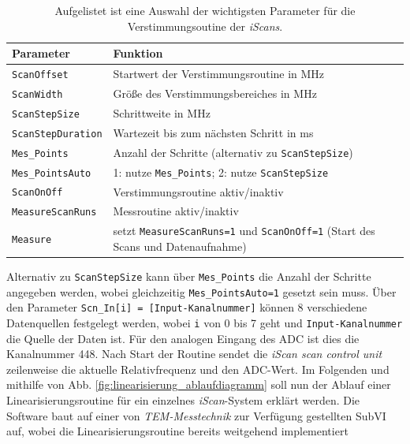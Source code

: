 \begin{table}
	\begin{tabular}{p{}p{}}
		\toprule
			Parameter & Funktion \\
		\midrule[1px]
		\hline
			\lstinline|ScanOffset| & Startwert der Verstimmungsroutine in MHz\\
			\lstinline|ScanWidth| & Größe des Verstimmungsbereiches in MHz\\
			\lstinline|ScanStepSize| & Schrittweite in MHz\\
			\lstinline|ScanStepDuration| & Wartezeit bis zum nächsten Schritt in ms\\
			\lstinline|Mes_Points| & Anzahl der Schritte (alternativ zu
			\lstinline|ScanStepSize|)\\
			\lstinline|Mes_PointsAuto| & 1: nutze \lstinline|Mes_Points|; 2: nutze
			\lstinline|ScanStepSize|\\
			\lstinline|ScanOnOff| & Verstimmungsroutine aktiv/inaktiv\\
			\lstinline|MeasureScanRuns| & Messroutine aktiv/inaktiv\\
			\lstinline|Measure| & setzt
			\lstinline|MeasureScanRuns=1| und \lstinline|ScanOnOff=1| (Start des Scans
			und Datenaufnahme)\\
		\bottomrule[1px]
	\end{tabular}
	\caption[Parameter der Verstimmungsoutine]{Aufgelistet ist eine
	Auswahl der wichtigsten Parameter für die Verstimmungsoutine der
	\textit{iScans}.}
	\label{tab:verstimmungsroutine_parameter}
\end{table}
Alternativ zu \lstinline|ScanStepSize| kann über \lstinline|Mes_Points| die
Anzahl der Schritte angegeben werden, wobei gleichzeitig
\lstinline|Mes_PointsAuto=1| gesetzt sein muss. Über den Parameter
\lstinline|Scn_In[i] = [Input-Kanalnummer]| können 8
verschiedene Datenquellen festgelegt werden, wobei
\lstinline|i| von 0 bis 7 geht und \lstinline|Input-Kanalnummer| die Quelle
der Daten ist. Für den analogen Eingang des ADC ist dies die Kanalnummer 448.
Nach Start der Routine sendet die \textit{iScan scan control unit} zeilenweise
die aktuelle Relativfrequenz und den ADC-Wert. Im Folgenden und mithilfe von
Abb. \ref{fig:linearisierung_ablaufdiagramm} soll nun der Ablauf einer
Linearisierungsroutine für ein einzelnes \textit{iScan}-System erklärt werden.
Die Software baut auf einer von \textit{TEM-Messtechnik} zur Verfügung gestellten
SubVI auf, wobei die Linearisierungsroutine bereits weitgehend implementiert
